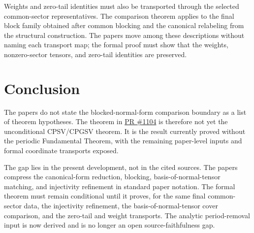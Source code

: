 \documentclass{article}
\begin{document}
Weights and zero-tail identities must also be transported through the selected
common-sector representatives. The comparison theorem applies to the final
block family obtained after common blocking and the canonical relabeling from
the structural construction. The papers move among these descriptions without
naming each transport map; the formal proof must show that the weights,
nonzero-sector tensors, and zero-tail identities are preserved.

\section{Conclusion}

The papers do not state the blocked-normal-form comparison boundary as a list of
theorem hypotheses. The theorem in
\href{https://github.com/LionSR/TNLean/pull/1104}{PR \#1104} is therefore not
yet the unconditional CPSV/CPGSV theorem. It is the result currently proved
without the periodic Fundamental Theorem, with the remaining paper-level inputs
and formal coordinate transports exposed.

The gap lies in the present \Lean{} development, not in the cited sources. The
papers compress the canonical-form reduction, blocking, basis-of-normal-tensor
matching, and injectivity refinement in standard paper notation. The formal
theorem must remain conditional until it proves, for the same final
common-sector data, the injectivity refinement, the basis-of-normal-tensor
cover comparison, and the zero-tail and weight transports. The analytic
period-removal input is now derived and is no longer an open
source-faithfulness gap.



\end{document}
